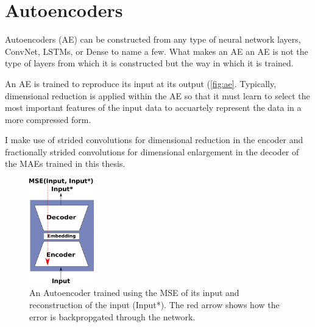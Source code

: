 %
%	
%
%	

\section{Autoencoders}
Autoencoders (AE) can be constructed from any type of neural network layers, ConvNet, LSTMs, or Dense to name a few. What makes an AE an AE is not the type of layers from which it is constructed but the way in which it is trained.

An AE is trained to reproduce its input at its output (\autoref{fig:ae}. Typically, dimensional reduction is applied within the AE so that it must learn to select the most important features of the input data to accuartely represent the data in a more compressed form. 

I make use of strided convolutions for dimensional reduction in the encoder and fractionally strided convolutions for dimensional enlargement in the decoder of the MAEs trained in this thesis.

\begin{figure}
	\centering
	\includegraphics[width=0.25\textwidth]{Figs/intro2dl/AE.png}
	
	\caption{An Autoencoder trained using the MSE of its input and reconstruction of the input (Input*). The red arrow shows how the error is backpropgated through the network.}
	\label{fig:ae}
\end{figure}




